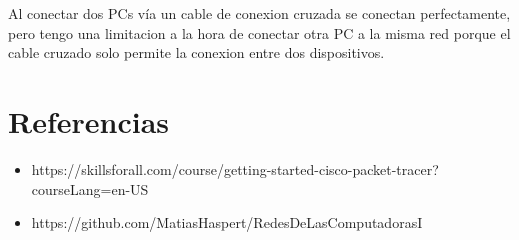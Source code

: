 \documentclass[12pt, a4paper]{article}
\begin{document}
Al conectar dos PCs vía un cable de conexion cruzada se conectan perfectamente, pero tengo una limitacion a la hora de conectar otra PC a la misma red porque el cable cruzado solo permite la conexion entre dos dispositivos.


\section{Referencias}
\begin{itemize}
    \item https://skillsforall.com/course/getting-started-cisco-packet-tracer?courseLang=en-US
    \item https://github.com/MatiasHaspert/RedesDeLasComputadorasI
\end{itemize}
\end{document}
